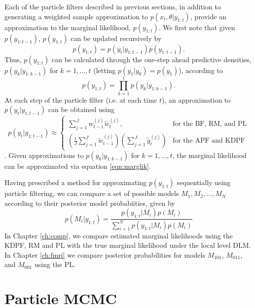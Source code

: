 Each of the particle filters described in previous sections, in addition to generating a weighted sample approximation to $p(x_t,\theta|y_{1:t})$, provide an approximation to the marginal likelihood, $p(y_{1:t})$. We first note that given $p(y_{1:t-1})$, $p(y_{1:t})$ can be updated recursively by
\begin{equation}
p(y_{1:t}) = p(y_t|y_{1:t-1})p(y_{1:t-1}). \label{eqn:marglik:recurse}
\end{equation}
Thus, $p(y_{1:t})$ can be calculated through the one-step ahead predictive densities, $p(y_k|y_{1:k-1})$ for $k=1,\ldots,t$ (letting $p(y_1|y_0) = p(y_1)$), according to
\begin{equation}
p(y_{1:t}) = \prod_{k=1}^t p(y_k|y_{1:k-1}). \label{eqn:marglik}
\end{equation}
At each step of the particle filter (i.e. at each time $t$), an approximation to $p(y_t|y_{1:t-1})$ can be obtained using
\begin{equation}
p(y_t|y_{1:t-1}) \approx \left\{\begin{array}{ll} \sum_{j=1}^J w^{(j)}_{t-1}\tilde{w}^{(j)}_t, & \mbox{for the BF, RM, and PL} \\ \left(\frac{1}{J}\sum_{j=1}^J \tilde{w}^{(j)}_{t-1}\right)\left(\sum_{j=1}^J\tilde{g}^{(j)}_t\right) & \mbox{for the APF and KDPF} \end{array} \right.\label{eqn:onestep:pf}
\end{equation}
\cite[see Section 4.2][]{douc:joh:tut:2009}. Given approximations to $p(y_k|y_{1:k-1})$ for $k = 1,\ldots,t$, the marginal likelihood can be approximated via equation \eqref{eqn:marglik}.

Having prescribed a method for approximating $p(y_{1:t})$ sequentially using particle filtering, we can compare a set of possible models ${M_1,M_2,\ldots,M_N}$ according to their posterior model probabiities, given by
\begin{equation}
p(M_i|y_{1:t}) = \frac{p(y_{1:t}|M_i)p(M_i)}{\sum_{i=1}^N p(y_{1:t}|M_i)p(M_i)} \label{eqn:modelcomp}
\end{equation}
In Chapter \ref{ch:comp}, we compare estimated marginal likelihoods using the KDPF, RM and PL with the true marginal likelihood under the local level DLM. In Chapter \ref{ch:fmri} we compare posterior probabilities for models $M_{101}$, $M_{011}$, and $M_{001}$ using the PL.

\section{Particle MCMC \label{sec:pmcmc}}

